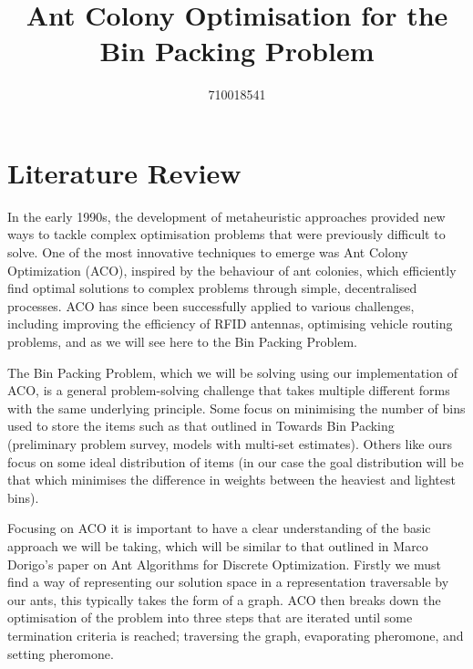 \documentclass[sigconf]{acmart}
\begin{document}
    \title{Ant Colony Optimisation for the Bin Packing Problem}
    \author{710018541}
    \maketitle
    
    \section{Literature Review}
        In the early 1990s, the development of metaheuristic approaches provided new ways to tackle complex optimisation problems that were previously difficult to solve. One of the most innovative techniques to emerge was Ant Colony Optimization (ACO), inspired by the behaviour of ant colonies, which efficiently find optimal solutions to complex problems through simple, decentralised processes. ACO has since been successfully applied to various challenges, including improving the efficiency of RFID antennas\cite{4426906}, optimising vehicle routing problems\cite{Emilio2004AntCO}, and as we will see here to the Bin Packing Problem.\newline

        The Bin Packing Problem, which we will be solving using our implementation of ACO, is a general problem-solving challenge that takes multiple different forms with the same underlying principle. Some focus on minimising the number of bins used to store the items such as that outlined in Towards Bin Packing (preliminary problem survey, models with multi-set estimates)\cite{Levin2016TowardsBP}. Others like ours focus on some ideal distribution of items (in our case the goal distribution will be that which minimises the difference in weights between the heaviest and lightest bins).\newline

        Focusing on ACO it is important to have a clear understanding of the basic approach we will be taking, which will be similar to that outlined in Marco Dorigo’s paper on Ant Algorithms for Discrete Optimization\cite{10.1162/106454699568728}. Firstly we must find a way of representing our solution space in a representation traversable by our ants, this typically takes the form of a graph. ACO then breaks down the optimisation of the problem into three steps that are iterated until some termination criteria is reached; traversing the graph, evaporating pheromone, and setting pheromone.\newline
        
\end{document}
